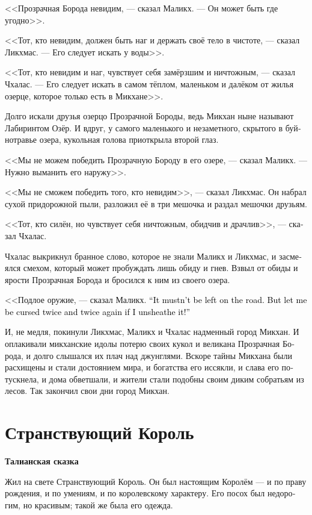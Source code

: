 \documentclass[a4paper,12pt,fleqn]{book}\usepackage{cooltooltips}\usepackage{polyglossia}\setdefaultlanguage[babelshorthands=true]{russian}\setotherlanguage{english}\defaultfontfeatures{Ligatures=TeX,Mapping=tex-text} \usepackage{xcolor}\definecolor{lightgray}{HTML}{bbbbbb}\color{lightgray}\newcommand{\ml}[3]{\textenglish{\textcolor{black}{#3}}}
\newcommand{\textspace}{\vspace{1em}{\centering\Large\bfseries<...>\par}\vspace{1em}}
\begin{document}
{<<Прозрачная Борода невидим, --- сказал Маликх.
--- Он может быть где угодно>>.

<<Тот, кто невидим, должен быть наг и держать своё тело в чистоте, --- сказал Ликхмас.
--- Его следует искать у воды>>.

<<Тот, кто невидим и наг, чувствует себя замёрзшим и ничтожным, --- сказал Чхалас.
--- Его следует искать в самом тёплом, маленьком и далёком от жилья озерце, которое только есть в Микхане>>.

Долго искали друзья озерцо Прозрачной Бороды, ведь Микхан ныне называют Лабиринтом Озёр.
И вдруг, у самого маленького и незаметного, скрытого в буйнотравье озера, кукольная голова приоткрыла второй глаз.

<<Мы не можем победить Прозрачную Бороду в его озере, --- сказал Маликх.
--- Нужно выманить его наружу>>.

<<Мы не сможем победить того, кто невидим>>, --- сказал Ликхмас.
Он набрал сухой придорожной пыли, разложил её в три мешочка и раздал мешочки друзьям.

<<Тот, кто силён, но чувствует себя ничтожным, обидчив и драчлив>>, --- сказал Чхалас.

Чхалас выкрикнул бранное слово, которое не знали Маликх и Ликхмас, и засмеялся смехом, который может пробуждать лишь обиду и гнев.
Взвыл от обиды и ярости Прозрачная Борода и бросился к ним из своего озера.

\textspace

<<Подлое оружие, --- сказал Маликх.
\ml{$0$}
{--- Нельзя оставлять на дороге такое.}
{``It mustn't be left on the road.}
\ml{$0$}
{Но будь я проклят дважды два раза, если достану его из ножен!>>}
{But let me be cursed twice and twice again if I unsheathe it!''}

И, не медля, покинули Ликхмас, Маликх и Чхалас надменный город Микхан.
И оплакивали микханские идолы потерю своих кукол и великана Прозрачная Борода, и долго слышался их плач над джунглями.
Вскоре тайны Микхана были расхищены и стали достоянием мира, и богатства его иссякли, и слава его потускнела, и дома обветшали, и жители стали подобны своим диким собратьям из лесов.
Так закончил свои дни город Микхан.

\section{Странствующий Король}

\textbf{Талианская сказка}

Жил на свете Странствующий Король.
Он был настоящим Королём --- и по праву рождения, и по умениям, и по королевскому характеру.
Его посох был недорогим, но красивым;
такой же была его одежда.

}
\end{document}
